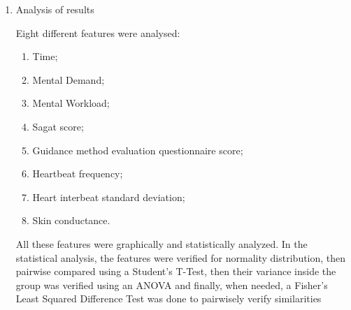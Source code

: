 \begin{enumerate}[label = Step \arabic* -- ]
    \item Analysis of results
    
    Eight different features were analysed:

    \begin{enumerate}[label = \alph*)]
        \item Time;
        \item Mental Demand;
        \item Mental Workload;
        \item Sagat score;
        \item Guidance method evaluation questionnaire score;
        \item Heartbeat frequency;
        \item Heart interbeat standard deviation;
        \item Skin conductance.
    \end{enumerate}
    
    All these features were graphically and statistically analyzed. In the statistical analysis, the features were verified for normality distribution, then pairwise compared using a Student's T-Test, then their variance inside the group was verified using an ANOVA and finally, when needed, a Fisher's Least Squared Difference Test was done to pairwisely verify similarities

\end{enumerate}


\FloatBarrier

